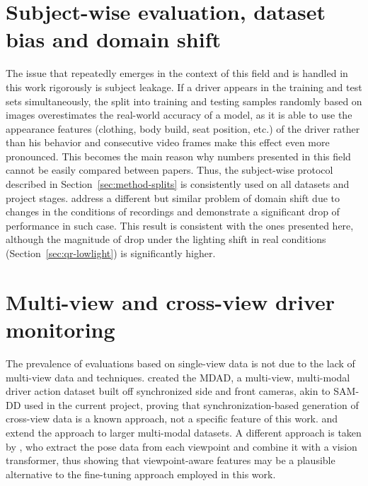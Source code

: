 \section{Subject-wise evaluation, dataset bias and domain shift}

The issue that repeatedly emerges in the context of this field and is handled in this work rigorously is subject leakage. If a driver appears in the training and test sets simultaneously, the split into training and testing samples randomly based on images overestimates the real-world accuracy of a model, as it is able to use the appearance features (clothing, body build, seat position, etc.) of the driver rather than his behavior and consecutive video frames make this effect even more pronounced. This becomes the main reason why numbers presented in this field cannot be easily compared between papers. Thus, the subject-wise protocol described in Section~\ref{sec:method-splits} is consistently used on all datasets and project stages. \citet{wang2023driver} address a different but similar problem of domain shift due to changes in the conditions of recordings and demonstrate a significant drop of performance in such case. This result is consistent with the ones presented here, although the magnitude of drop under the lighting shift in real conditions (Section~\ref{sec:qr-lowlight}) is significantly higher.

\section{Multi-view and cross-view driver monitoring}
\label{sec:lit-crossview}

The prevalence of evaluations based on single-view data is not due to the lack of multi-view data and techniques. \citet{jegham2019mdad} created the MDAD, a multi-view, multi-modal driver action dataset built off synchronized side and front cameras, akin to SAM-DD \citep{yang2024samdd} used in the current project, proving that synchronization-based generation of cross-view data is a known approach, not a specific feature of this work. \citet{ortega2020dmd} and \citet{wang2023hundreddriver} extend the approach to larger multi-modal datasets. A different approach is taken by \citet{sengar2023poseviNet}, who extract the pose data from each viewpoint and combine it with a vision transformer, thus showing that viewpoint-aware features may be a plausible alternative to the fine-tuning approach employed in this work.

